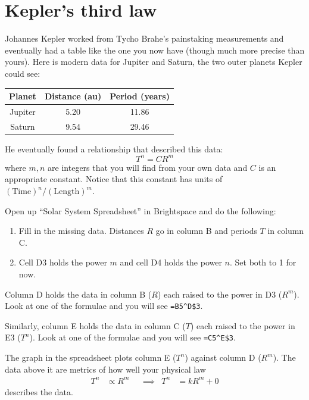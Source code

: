 \documentclass{handout}
\begin{document}
\section{Kepler's third law}

Johannes Kepler worked from Tycho Brahe's painstaking measurements and eventually had a table like the one you now have (though much more precise than yours). Here is modern data for Jupiter and Saturn, the two outer planets Kepler could see:
\begin{center}
    \begin{tabular}{ccc}
        \toprule
        Planet & Distance (au) & Period (years) \\ \midrule
        Jupiter & 5.20 & 11.86 \\
        Saturn & 9.54 & 29.46 \\
        \bottomrule
    \end{tabular}
\end{center}

He eventually found a relationship that described this data:
$$
T^n=CR^m
$$
where $m,n$ are integers that you will find from your own data and $C$ is an appropriate constant. Notice that this constant has units of $(\text{Time})^n/(\text{Length})^m$.

Open up ``Solar System Spreadsheet'' in Brightspace and do the following:
\begin{enumerate}
    \item Fill in the missing data. Distances $R$ go in column B and periods $T$ in column C.
    \item Cell D3 holds the power $m$ and cell D4 holds the power $n$. Set both to 1 for now.

\end{enumerate}
Column D holds the data in column B ($R$) each raised to the power in D3 ($R^m$). Look at one of the formulae and you will see \verb|=B5^D$3|. 

Similarly, column E holds the data in column C ($T$) each raised to the power in E3 ($T^n$). Look at one of the formulae and you will see \verb|=C5^E$3|. 

The graph in the spreadsheet plots column E ($T^n$) against column D ($R^m$). The data above it are metrics of how well your physical law 
\begin{align*}
    T^n &\propto R^m &&\implies & T^n &= k R^m + 0
\end{align*}
describes the data.
\end{document}
